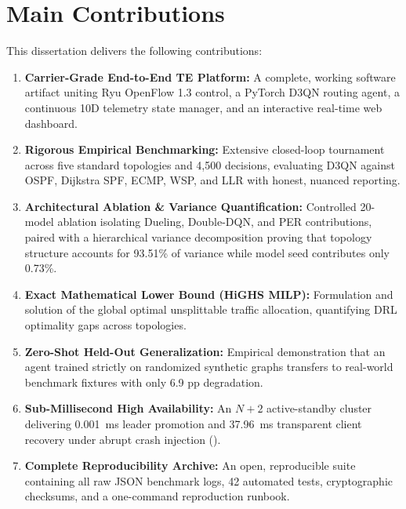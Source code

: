 \documentclass[12pt,a4paper,oneside]{report}
\newcommand{\code}[1]{\texttt{\detokenize{#1}}}
\begin{document}
\section{Main Contributions}
This dissertation delivers the following contributions:
\begin{enumerate}
  \item \textbf{Carrier-Grade End-to-End TE Platform:} A complete, working software artifact uniting Ryu OpenFlow 1.3 control, a PyTorch D3QN routing agent, a continuous 10D telemetry state manager, and an interactive real-time web dashboard.
  \item \textbf{Rigorous Empirical Benchmarking:} Extensive closed-loop tournament across five standard topologies and 4,500 decisions, evaluating D3QN against OSPF, Dijkstra SPF, ECMP, WSP, and LLR with honest, nuanced reporting.
  \item \textbf{Architectural Ablation \& Variance Quantification:} Controlled 20-model ablation isolating Dueling, Double-DQN, and PER contributions, paired with a hierarchical variance decomposition proving that topology structure accounts for 93.51\% of variance while model seed contributes only 0.73\%.
  \item \textbf{Exact Mathematical Lower Bound (HiGHS MILP):} Formulation and solution of the global optimal unsplittable traffic allocation, quantifying DRL optimality gaps across topologies.
  \item \textbf{Zero-Shot Held-Out Generalization:} Empirical demonstration that an agent trained strictly on randomized synthetic graphs transfers to real-world benchmark fixtures with only 6.9 pp degradation.
  \item \textbf{Sub-Millisecond High Availability:} An $N+2$ active-standby cluster delivering 0.001~ms leader promotion and 37.96~ms transparent client recovery under abrupt crash injection (\code{SIGKILL}).
  \item \textbf{Complete Reproducibility Archive:} An open, reproducible suite containing all raw JSON benchmark logs, 42 automated tests, cryptographic checksums, and a one-command reproduction runbook.
\end{enumerate}
\end{document}
